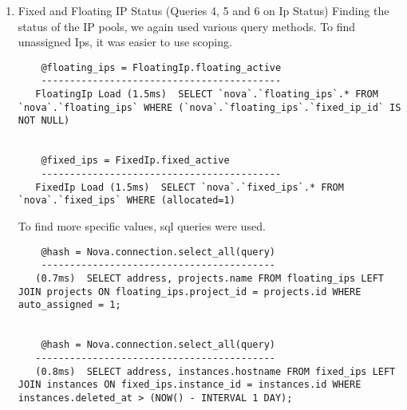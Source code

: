 \documentclass[12pt]{article}
\begin{document}
\begin{enumerate}
\begin{lstlisting}
 (0.3ms)  BEGIN
 SQL (0.7ms)  INSERT INTO "virtual_interface_cloud_user_associations" ("cloud_username", "created_at", "deleted_at", "shared_ip", "updated_at", "virtual_interface_id") VALUES ($1, $2, $3, $4, $5, $6) RETURNING "id" [["cloud_username", nil], ["created_at", Thu, 16 May 2013 13:02:29 UTC +00:00], ["deleted_at", nil], ["shared_ip", nil], ["updated_at", Thu, 16 May 2013 13:02:29 UTC +00:00], ["virtual_interface_id", nil]]
 (15.9ms)  COMMIT
\end{lstlisting}
\item Fixed and Floating IP Status
(Queries 4, 5 and 6 on Ip Status)
Finding the status of the IP pools, we again used various query methods. To find unassigned Ips, it was easier to use scoping.
\begin{lstlisting}
    @floating_ips = FloatingIp.floating_active
    ------------------------------------------
   FloatingIp Load (1.5ms)  SELECT `nova`.`floating_ips`.* FROM `nova`.`floating_ips` WHERE (`nova`.`floating_ips`.`fixed_ip_id` IS NOT NULL)


    @fixed_ips = FixedIp.fixed_active
    ------------------------------------------
   FixedIp Load (1.5ms)  SELECT `nova`.`fixed_ips`.* FROM `nova`.`fixed_ips` WHERE (allocated=1)
\end{lstlisting}
To find more specific values, sql queries were used.
\begin{lstlisting}
    @hash = Nova.connection.select_all(query)
    -----------------------------------------
   (0.7ms)  SELECT address, projects.name FROM floating_ips LEFT JOIN projects ON floating_ips.project_id = projects.id WHERE auto_assigned = 1;


    @hash = Nova.connection.select_all(query)
   ------------------------------------------
   (0.8ms)  SELECT address, instances.hostname FROM fixed_ips LEFT JOIN instances ON fixed_ips.instance_id = instances.id WHERE instances.deleted_at > (NOW() - INTERVAL 1 DAY);
\end{lstlisting}
\end{enumerate}
\end{document}
